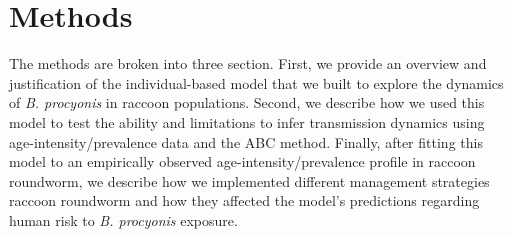 \documentclass[11pt]{article}
\begin{document}


\section{Methods}

The methods are broken into three section.  First, we provide an overview and justification of the individual-based model that we built to explore the dynamics of \emph{B. procyonis} in raccoon populations. Second, we describe how we used this model to test the ability and limitations to infer transmission dynamics using age-intensity/prevalence data and the ABC method. Finally, after fitting this model to an empirically observed age-intensity/prevalence profile in raccoon roundworm, we describe how we implemented different management strategies raccoon roundworm and how they affected the model's predictions regarding human risk to \emph{B. procyonis} exposure.
\end{document}
